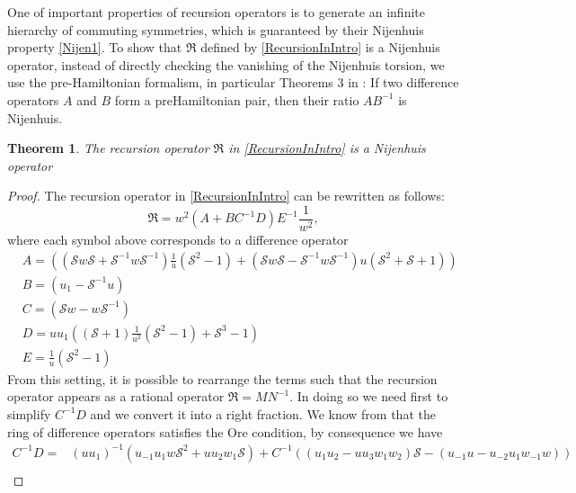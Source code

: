 \documentclass{article}
\numberwithin{equation}{section}
\newtheorem{theorem}{Theorem}[section]
\begin{document}
One of important properties of recursion operators is to generate an infinite hierarchy of commuting symmetries, which
is guaranteed by their Nijenhuis property \eqref{Nijen1}. To show that $\mathfrak{R}$ defined by \eqref{RecursionInIntro} is a
Nijenhuis operator, instead of directly checking the vanishing of the Nijenhuis torsion,
we use the pre-Hamiltonian formalism, in particular Theorems 3
in \cite{4}: If two difference operators $A$ and $B$ form a preHamiltonian pair, then their ratio $AB^{-1}$ is Nijenhuis.
	\begin{theorem} \label{Theorem1}
		The recursion operator $\mathfrak{R}$ in \eqref{RecursionInIntro} is a
Nijenhuis operator
	\end{theorem}
	\begin{proof}
		The recursion operator in \eqref{RecursionInIntro} can be rewritten as follows:
		\begin{equation}
			\mathfrak{R} = w^2 \left(A + B C^{-1} D\right) 
E^{-1}\frac{1}{w^2},
			\label{factorised2}
		\end{equation}
		where each symbol above corresponds to a difference operator
		\begin{equation}
			\begin{split}
				& A = \left(\left(\mathcal{S}w \mathcal{S} 
+\mathcal{S}^{-1} w \mathcal{S}^{-1} 
\right)\frac{1}{u}\left(\mathcal{S}^2-1\right) +\left( \mathcal{S} w\mathcal{S} 
-  \mathcal{S}^{-1}w \mathcal{S}^{-1}\right) u 
\left(\mathcal{S}^{2}+\mathcal{S}+1\right)\right)\\
				& B = \left( {u_1}-\mathcal{S}^{-1} u\right) \\
				& C = \left(\mathcal{S}w - w 
\mathcal{S}^{-1}\right)\\
				& D =  u u_1\left( \left(  \mathcal{S}+1\right) 
\frac{1}{u^2} \left( \mathcal{S}^2-1\right) 
+\mathcal{S}^3-1\right)\\
				& E = \frac{1}{u}\left(\mathcal{S}^2-1\right)
			\end{split}
			\label{definition2}
		\end{equation}
		From this setting, it is possible to rearrange the terms such 
that the recursion operator appears as a rational operator $\mathfrak{R} = M 
N^{-1}$. In doing so we need first to simplify $C^{-1}D$ and we convert it into a right fraction. We know from \cite{4} that the ring of difference operators satisfies the Ore condition, by consequence we have
\begin{equation*}
\begin{split}
C^{-1}D = &  \left({u u_1}\right)^{-1}\left(u_{-1} u_1 w \mathcal{S}^2+u u_2 w_1 \mathcal{S}\right) + C^{-1} \left((u_1 u_{2}-u u_3 w_1 w_2) \mathcal{S}-(u_{-1} u-u_{-2} u_{1} w_{-1} w) \right)\\

\end{split}
\end{equation*}
\end{proof}
\end{document}
